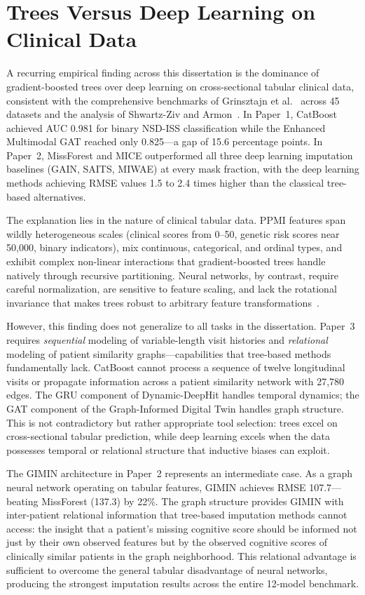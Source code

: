 \section{Trees Versus Deep Learning on Clinical Data}
\label{sec:trees-vs-dl}

A recurring empirical finding across this dissertation is the dominance of gradient-boosted trees over deep learning on cross-sectional tabular clinical data, consistent with the comprehensive benchmarks of Grinsztajn et al.~\cite{grinsztajn2022} across 45 datasets and the analysis of Shwartz-Ziv and Armon~\cite{shwartzziv2022}. In Paper~1, CatBoost achieved AUC 0.981 for binary NSD-ISS classification while the Enhanced Multimodal GAT reached only 0.825---a gap of 15.6 percentage points. In Paper~2, MissForest and MICE outperformed all three deep learning imputation baselines (GAIN, SAITS, MIWAE) at every mask fraction, with the deep learning methods achieving RMSE values 1.5 to 2.4 times higher than the classical tree-based alternatives.

The explanation lies in the nature of clinical tabular data. PPMI features span wildly heterogeneous scales (clinical scores from 0--50, genetic risk scores near 50,000, binary indicators), mix continuous, categorical, and ordinal types, and exhibit complex non-linear interactions that gradient-boosted trees handle natively through recursive partitioning. Neural networks, by contrast, require careful normalization, are sensitive to feature scaling, and lack the rotational invariance that makes trees robust to arbitrary feature transformations~\cite{grinsztajn2022}.

However, this finding does not generalize to all tasks in the dissertation. Paper~3 requires \textit{sequential} modeling of variable-length visit histories and \textit{relational} modeling of patient similarity graphs---capabilities that tree-based methods fundamentally lack. CatBoost cannot process a sequence of twelve longitudinal visits or propagate information across a patient similarity network with 27,780 edges. The GRU component of Dynamic-DeepHit handles temporal dynamics; the GAT component of the Graph-Informed Digital Twin handles graph structure. This is not contradictory but rather appropriate tool selection: trees excel on cross-sectional tabular prediction, while deep learning excels when the data possesses temporal or relational structure that inductive biases can exploit.

The GIMIN architecture in Paper~2 represents an intermediate case. As a graph neural network operating on tabular features, GIMIN achieves RMSE 107.7---beating MissForest (137.3) by 22\%. The graph structure provides GIMIN with inter-patient relational information that tree-based imputation methods cannot access: the insight that a patient's missing cognitive score should be informed not just by their own observed features but by the observed cognitive scores of clinically similar patients in the graph neighborhood. This relational advantage is sufficient to overcome the general tabular disadvantage of neural networks, producing the strongest imputation results across the entire 12-model benchmark.


